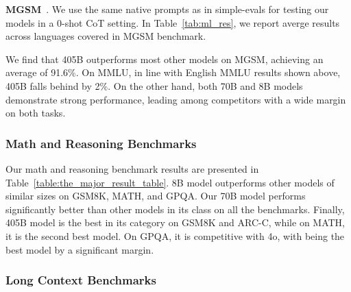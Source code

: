 \textbf{MGSM}~\citep{shi2022languagemodelsmultilingualchainofthought}.
We use the same native prompts as in simple-evals \citep{simpleevals} for testing our models in a 0-shot CoT setting. In Table~\ref{tab:ml_res}, we report averge results across languages covered in MGSM benchmark.

We find that \llamathree 405B outperforms most other models on MGSM, achieving an average of 91.6\%.
On MMLU, in line with English MMLU results shown above, \llamathree 405B falls behind \gpto by 2\%.
On the other hand, both \llamathree 70B and 8B models demonstrate strong performance, leading among competitors with a wide margin on both tasks.

\subsubsection{Math and Reasoning Benchmarks}
\label{subsubsec:reasoning_evals}

Our math and reasoning benchmark results are presented in Table~\ref{table:the_major_result_table}. \llamathree 8B model outperforms other models of similar sizes on GSM8K, MATH, and GPQA. Our 70B model performs significantly better than other models in its class on all the benchmarks. Finally, \llamathree 405B model is the best in its category on GSM8K and ARC-C, while on MATH, it is the second best model. On GPQA, it is competitive with \gpt4o, with \sonnet being the best model by a significant margin.



\subsubsection{Long Context Benchmarks}
\label{subsubsec:long_context_evals}

